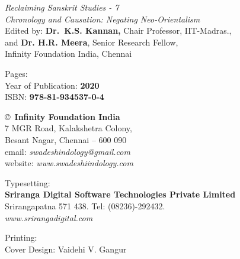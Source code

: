 \thispagestyle{empty}

\noindent
{\fontsize{9}{11}\selectfont\sl Reclaiming Sanskrit Studies - 7}\\
\textit{Chronology and Causation: Negating Neo-Orientalism}\\
Edited by: {\bf Dr.\ K.S. Kannan,} Chair Professor, IIT-Madras.,\\
and {\bf Dr. H.R. Meera}, Senior Research Fellow,\\
 Infinity Foundation India, Chennai\\
\vfill

\noindent
Pages: {\bf\pageref{bookend}}\\
Year of Publication: {\bf 2020}\\
ISBN: {\bf 978-81-934537-0-4}\\
\vfill

\noindent
\copyright\ {\bf Infinity Foundation India}\\ 
7 MGR Road, Kalakshetra Colony,\\ 
Besant Nagar, Chennai -- 600 090\\
email: {\sl swadeshindology@gmail.com}\\
website: {\sl www.swadeshiindology.com} 
\vfill

\noindent
Typesetting:\\ 
{\bf Sriranga Digital Software Technologies Private Limited}\\ 
Srirangapatna 571 438. Tel: (08236)-292432.\\
{\sl www.srirangadigital.com}
\vfill

\noindent
Printing:\\

\noindent
Cover Design: Vaidehi V. Gangur\\ 

